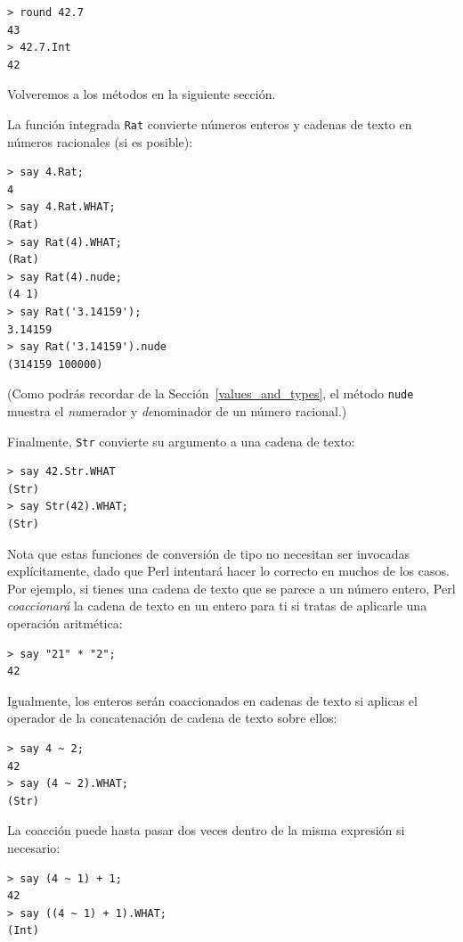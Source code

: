 \begin{verbatim}
> round 42.7
43
> 42.7.Int
42
\end{verbatim}

Volveremos a los métodos en la siguiente sección.

La función integrada {\tt Rat} convierte números
enteros y cadenas de texto en números racionales (si es posible):

\begin{verbatim}
> say 4.Rat;
4
> say 4.Rat.WHAT;
(Rat)
> say Rat(4).WHAT;
(Rat)
> say Rat(4).nude;
(4 1)
> say Rat('3.14159');
3.14159
> say Rat('3.14159').nude
(314159 100000)
\end{verbatim}
%
(Como podrás recordar de la Sección~\ref{values_and_types}, 
el método \verb'nude' muestra el \emph{nu}merador y  
\emph{de}nominador de un número racional.)

Finalmente, {\tt Str} convierte su argumento a una cadena de texto:

\begin{verbatim}
> say 42.Str.WHAT
(Str)
> say Str(42).WHAT;
(Str)
\end{verbatim}

Nota que estas funciones de conversión de tipo no necesitan ser
invocadas explícitamente, dado que Perl intentará hacer lo correcto
en muchos de los casos. Por ejemplo, si tienes una cadena de texto
que se parece a un número entero, Perl \emph{coaccionará} la cadena 
de texto en un entero para ti si tratas de aplicarle una operación 
aritmética:

\begin{verbatim}
> say "21" * "2";
42
\end{verbatim}

Igualmente, los enteros serán coaccionados en cadenas de texto
si aplicas el operador de la concatenación de cadena de texto
sobre ellos:

\begin{verbatim}
> say 4 ~ 2;
42
> say (4 ~ 2).WHAT;
(Str)
\end{verbatim}

La coacción puede hasta pasar dos veces dentro de la misma expresión
si necesario:

\begin{verbatim}
> say (4 ~ 1) + 1;
42
> say ((4 ~ 1) + 1).WHAT;
(Int)
\end{verbatim}

